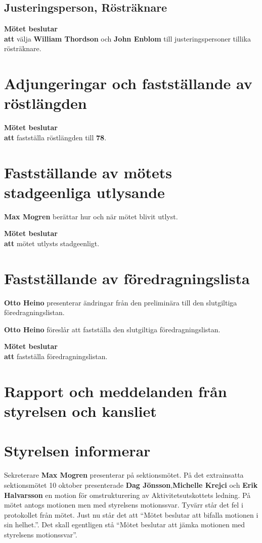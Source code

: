 \documentclass{datateknologsektionen-document}
\newcommand{\ind}{\hspace*{2em}}
\newcommand{\motetbeslutar}{\textbf{Mötet beslutar}}
\newcommand{\att}{\\\ind\textbf{att}}
\begin{document}
\subsection{Justeringsperson, Rösträknare}
\motetbeslutar\att{} välja \textbf{William Thordson} och \textbf{John Enblom} till justeringspersoner tillika rösträknare.




\section{Adjungeringar och fastställande av röstlängden}
\motetbeslutar
\att{} fastställa röstlängden till \textbf{78}.





\section{Fastställande av mötets stadgeenliga utlysande}
\textbf{Max Mogren} berättar hur och när mötet blivit utlyst.

\motetbeslutar
\att{} mötet utlysts stadgeenligt.



\pagebreak
\section{Fastställande av föredragningslista}
\textbf{Otto Heino} presenterar ändringar från den preliminära till den slutgiltiga föredragningslistan.

\textbf{Otto Heino} föreslår att fastställa den slutgiltiga föredragningslistan.

\motetbeslutar\att{} fastställa föredragningslistan.


\section{Rapport och meddelanden från styrelsen och kansliet}



\section{Styrelsen informerar}
Sekreterare \textbf{Max Mogren} presenterar på sektionsmötet.
På det extrainsatta sektionsmötet 10 oktober presenterade \textbf{Dag Jönsson},\textbf{Michelle Krejci} och \textbf{Erik Halvarsson} en motion för omstrukturering av Aktivitetsutskottets ledning. På mötet antogs motionen men med styrelsens motionssvar. Tyvärr står det fel i protokollet från mötet. Just nu står det att ``Mötet beslutar att bifalla motionen i sin helhet.''. Det skall egentligen stå ``Mötet beslutar att jämka motionen med styrelsens motionssvar''.
\end{document}
